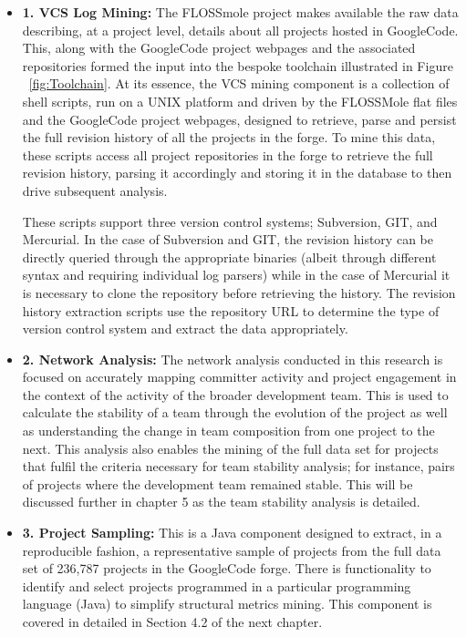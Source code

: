\begin{itemize}
\item \textbf{1. VCS Log Mining:} The FLOSSmole project makes available the raw data describing, at a project level, details about all projects hosted in GoogleCode. This, along with the GoogleCode project webpages and the associated repositories formed the input into the bespoke toolchain illustrated in Figure ~\ref{fig:Toolchain}. At its essence, the VCS mining component is a collection of shell scripts, run on a UNIX platform and driven by the FLOSSMole flat files and the GoogleCode project webpages, designed to retrieve, parse and persist the full revision history of all the projects in the forge. To mine this data, these scripts access all project repositories in the forge to retrieve the full revision history, parsing it accordingly and storing it in the database to then drive subsequent analysis. 

These scripts support three version control systems; Subversion, GIT, and Mercurial. In the case of Subversion and GIT, the revision history can be directly queried through the appropriate binaries (albeit through different syntax and requiring individual log parsers) while in the case of Mercurial it is necessary to clone the repository before retrieving the history. The revision history extraction scripts use the repository URL to determine the type of version control system and extract the data appropriately. 

\item \textbf{2. Network Analysis:} The network analysis conducted in this research is focused on accurately mapping committer activity and project engagement in the context of the activity of the broader development team. This is used to calculate the stability of a team through the evolution of the project as well as understanding the change in team composition from one project to the next. This analysis also enables the mining of the full data set for projects that fulfil the criteria necessary for team stability analysis; for instance, pairs of projects where the development team remained stable. This will be discussed further in chapter 5 as the team stability analysis is detailed.

\item \textbf{3. Project Sampling:} This is a Java component designed to extract, in a reproducible fashion, a representative sample of projects from the full data set of 236,787 projects in the GoogleCode forge. There is functionality to identify and select projects programmed in a particular programming language (Java) to simplify structural metrics mining. This component is covered in detailed in Section 4.2 of the next chapter.


\end{itemize}
